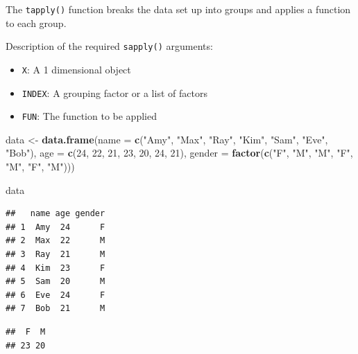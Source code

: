 \documentclass[
]{book}
\newenvironment{Shaded}{\begin{snugshade}}{\end{snugshade}}
\newcommand{\DataTypeTok}[1]{\textcolor[rgb]{0.13,0.29,0.53}{#1}}
\newcommand{\DecValTok}[1]{\textcolor[rgb]{0.00,0.00,0.81}{#1}}
\newcommand{\KeywordTok}[1]{\textcolor[rgb]{0.13,0.29,0.53}{\textbf{#1}}}
\newcommand{\NormalTok}[1]{#1}
\newcommand{\OperatorTok}[1]{\textcolor[rgb]{0.81,0.36,0.00}{\textbf{#1}}}
\newcommand{\StringTok}[1]{\textcolor[rgb]{0.31,0.60,0.02}{#1}}
\providecommand{\tightlist}{%
  \setlength{\itemsep}{0pt}\setlength{\parskip}{0pt}}
\begin{document}
The \texttt{tapply()} function breaks the data set up into groups and applies a function to each group.

Description of the required \texttt{sapply()} arguments:

\begin{itemize}
\tightlist
\item
  \texttt{X}: A 1 dimensional object
\item
  \texttt{INDEX}: A grouping factor or a list of factors
\item
  \texttt{FUN}: The function to be applied
\end{itemize}

\begin{Shaded}
\begin{Highlighting}[]
\NormalTok{data <-}\StringTok{ }\KeywordTok{data.frame}\NormalTok{(}\DataTypeTok{name =} \KeywordTok{c}\NormalTok{(}\StringTok{"Amy"}\NormalTok{, }\StringTok{"Max"}\NormalTok{, }\StringTok{"Ray"}\NormalTok{, }\StringTok{"Kim"}\NormalTok{, }\StringTok{"Sam"}\NormalTok{,}
    \StringTok{"Eve"}\NormalTok{, }\StringTok{"Bob"}\NormalTok{), }\DataTypeTok{age =} \KeywordTok{c}\NormalTok{(}\DecValTok{24}\NormalTok{, }\DecValTok{22}\NormalTok{, }\DecValTok{21}\NormalTok{, }\DecValTok{23}\NormalTok{, }\DecValTok{20}\NormalTok{, }\DecValTok{24}\NormalTok{, }\DecValTok{21}\NormalTok{), }\DataTypeTok{gender =} \KeywordTok{factor}\NormalTok{(}\KeywordTok{c}\NormalTok{(}\StringTok{"F"}\NormalTok{,}
    \StringTok{"M"}\NormalTok{, }\StringTok{"M"}\NormalTok{, }\StringTok{"F"}\NormalTok{, }\StringTok{"M"}\NormalTok{, }\StringTok{"F"}\NormalTok{, }\StringTok{"M"}\NormalTok{)))}

\NormalTok{data}
\end{Highlighting}
\end{Shaded}

\begin{verbatim}
##   name age gender
## 1  Amy  24      F
## 2  Max  22      M
## 3  Ray  21      M
## 4  Kim  23      F
## 5  Sam  20      M
## 6  Eve  24      F
## 7  Bob  21      M
\end{verbatim}

\begin{Shaded}
\end{Shaded}

\begin{verbatim}
##  F  M 
## 23 20
\end{verbatim}
\end{document}
